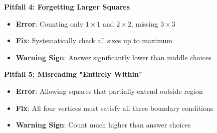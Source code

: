 \documentclass[12pt]{article}
\begin{document}
\begin{roadmapbox}
\textbf{Pitfall 4: Forgetting Larger Squares}
\begin{itemize}
    \item \textbf{Error}: Counting only $1 \times 1$ and $2 \times 2$, missing $3 \times 3$
    \item \textbf{Fix}: Systematically check all sizes up to maximum
    \item \textbf{Warning Sign}: Answer significantly lower than middle choices
\end{itemize}

\textbf{Pitfall 5: Misreading "Entirely Within"}
\begin{itemize}
    \item \textbf{Error}: Allowing squares that partially extend outside region
    \item \textbf{Fix}: All four vertices must satisfy all three boundary conditions
    \item \textbf{Warning Sign}: Count much higher than answer choices
\end{itemize}
\end{roadmapbox}
\end{document}
